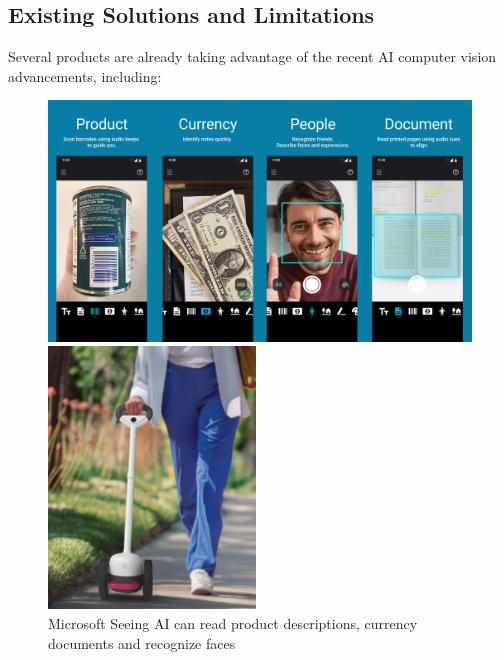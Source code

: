 \documentclass[12pt,a4paper]{article}
\begin{document}
\subsection{Existing Solutions and Limitations}

Several products are already taking advantage of the recent AI computer vision advancements, including:

\begin{figure}[ht!]
    \centering
    \begin{minipage}[t]{0.65\textwidth}
        \centering
        \includegraphics[width=\textwidth]{Seeing-AI-Android-channels.png}
        \caption{Microsoft Seeing AI can read product descriptions, currency documents and recognize faces \cite{microsoft2025}}
        \label{seeingai_pic}
    \end{minipage}%
    \hfill
    \begin{minipage}[t]{0.3\textwidth}
        \centering
        \includegraphics[width=\textwidth]{glidance.png}

\end{minipage}
\end{figure}
\end{document}
